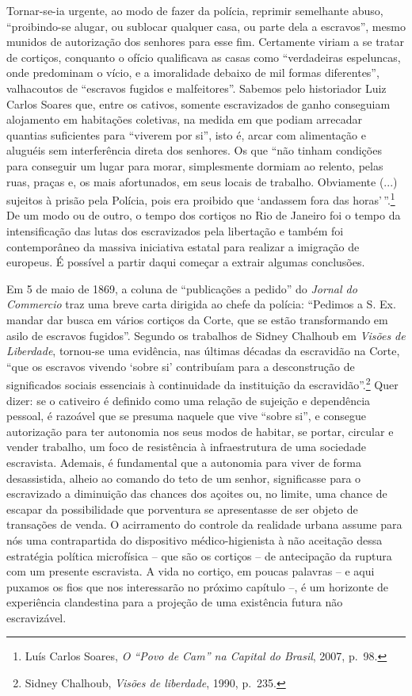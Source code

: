 Tornar-se-ia urgente, ao modo de fazer da polícia, reprimir semelhante
abuso, ``proibindo-se alugar, ou sublocar qualquer casa, ou parte dela a
escravos'', mesmo munidos de autorização dos senhores para esse fim.
Certamente viriam a se tratar de cortiços, conquanto o ofício
qualificava as casas como ``verdadeiras espeluncas, onde predominam o
vício, e a imoralidade debaixo de mil formas diferentes'', valhacoutos
de ``escravos fugidos e malfeitores''. Sabemos pelo historiador Luiz
Carlos Soares que, entre os cativos, somente escravizados de ganho
conseguiam alojamento em habitações coletivas, na medida em que podiam
arrecadar quantias suficientes para ``viverem por si'', isto é, arcar
com alimentação e aluguéis sem interferência direta dos senhores. Os que
``não tinham condições para conseguir um lugar para morar, simplesmente
dormiam ao relento, pelas ruas, praças e, os mais afortunados, em seus
locais de trabalho. Obviamente (...) sujeitos à prisão pela Polícia,
pois era proibido que `andassem fora das horas'\,''.\footnote{Luís
  Carlos Soares, \emph{O ``Povo de Cam'' na Capital do Brasil}, 2007,
  p.~98.} De um modo ou de outro, o tempo dos cortiços no Rio de Janeiro
foi o tempo da intensificação das lutas dos escravizados pela libertação
e também foi contemporâneo da massiva iniciativa estatal para realizar a
imigração de europeus. É possível a partir daqui começar a extrair
algumas conclusões.

Em 5 de maio de 1869, a coluna de ``publicações a pedido'' do
\emph{Jornal do Commercio} traz uma breve carta dirigida ao chefe da
polícia: ``Pedimos a S. Ex. mandar dar busca em vários cortiços da
Corte, que se estão transformando em asilo de escravos fugidos''.
Segundo os trabalhos de Sidney Chalhoub em \emph{Visões de Liberdade},
tornou-se uma evidência, nas últimas décadas da escravidão na Corte,
``que os escravos vivendo `sobre si' contribuíam para a desconstrução de
significados sociais essenciais à continuidade da instituição da
escravidão''.\footnote{Sidney Chalhoub, \emph{Visões de liberdade},
  1990, p.~235.} Quer dizer: se o cativeiro é definido como uma relação
de sujeição e dependência pessoal, é razoável que se presuma naquele que
vive ``sobre si'', e consegue autorização para ter autonomia nos seus
modos de habitar, se portar, circular e vender trabalho, um foco de
resistência à infraestrutura de uma sociedade escravista. Ademais, é
fundamental que a autonomia para viver de forma desassistida, alheio ao
comando do teto de um senhor, significasse para o escravizado a
diminuição das chances dos açoites ou, no limite, uma chance de escapar
da possibilidade que porventura se apresentasse de ser objeto de
transações de venda. O acirramento do controle da realidade urbana
assume para nós uma contrapartida do dispositivo médico-higienista à não
aceitação dessa estratégia política microfísica -- que são os cortiços
-- de antecipação da ruptura com um presente escravista. A vida no
cortiço, em poucas palavras -- e aqui puxamos os fios que nos
interessarão no próximo capítulo --, é um horizonte de experiência
clandestina para a projeção de uma existência futura não escravizável.

